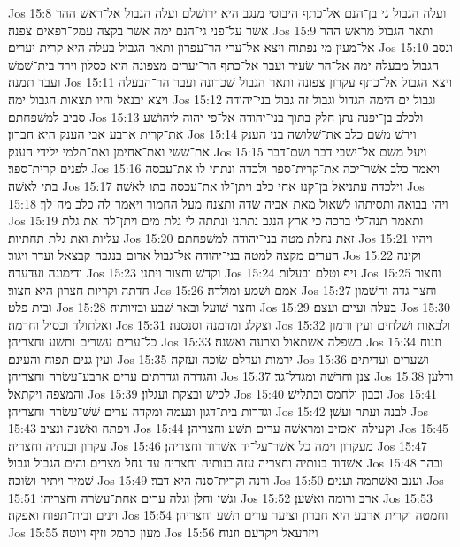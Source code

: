 Jos 15:8  ועלה הגבול גי בן־הנם אל־כתף היבוסי מנגב היא ירושׁלם ועלה הגבול אל־ראשׁ ההר אשׁר על־פני גי־הנם ימה אשׁר בקצה עמק־רפאים צפנה׃
Jos 15:9  ותאר הגבול מראשׁ ההר אל־מעין מי נפתוח ויצא אל־ערי הר־עפרון ותאר הגבול בעלה היא קרית יערים׃
Jos 15:10  ונסב הגבול מבעלה ימה אל־הר שׂעיר ועבר אל־כתף הר־יערים מצפונה היא כסלון וירד בית־שׁמשׁ ועבר תמנה׃
Jos 15:11  ויצא הגבול אל־כתף עקרון צפונה ותאר הגבול שׁכרונה ועבר הר־הבעלה ויצא יבנאל והיו תצאות הגבול ימה׃
Jos 15:12  וגבול ים הימה הגדול וגבול זה גבול בני־יהודה סביב למשׁפחתם׃
Jos 15:13  ולכלב בן־יפנה נתן חלק בתוך בני־יהודה אל־פי יהוה ליהושׁע את־קרית ארבע אבי הענק היא חברון׃
Jos 15:14  וירשׁ משׁם כלב את־שׁלושׁה בני הענק את־שׁשׁי ואת־אחימן ואת־תלמי ילידי הענק׃
Jos 15:15  ויעל משׁם אל־ישׁבי דבר ושׁם־דבר לפנים קרית־ספר׃
Jos 15:16  ויאמר כלב אשׁר־יכה את־קרית־ספר ולכדה ונתתי לו את־עכסה בתי לאשׁה׃
Jos 15:17  וילכדה עתניאל בן־קנז אחי כלב ויתן־לו את־עכסה בתו לאשׁה׃
Jos 15:18  ויהי בבואה ותסיתהו לשׁאול מאת־אביה שׂדה ותצנח מעל החמור ויאמר־לה כלב מה־לך׃
Jos 15:19  ותאמר תנה־לי ברכה כי ארץ הנגב נתתני ונתתה לי גלת מים ויתן־לה את גלת עליות ואת גלת תחתיות׃
Jos 15:20  זאת נחלת מטה בני־יהודה למשׁפחתם׃
Jos 15:21  ויהיו הערים מקצה למטה בני־יהודה אל־גבול אדום בנגבה קבצאל ועדר ויגור׃
Jos 15:22  וקינה ודימונה ועדעדה׃
Jos 15:23  וקדשׁ וחצור ויתנן׃
Jos 15:24  זיף וטלם ובעלות׃
Jos 15:25  וחצור חדתה וקריות חצרון היא חצור׃
Jos 15:26  אמם ושׁמע ומולדה׃
Jos 15:27  וחצר גדה וחשׁמון ובית פלט׃
Jos 15:28  וחצר שׁועל ובאר שׁבע ובזיותיה׃
Jos 15:29  בעלה ועיים ועצם׃
Jos 15:30  ואלתולד וכסיל וחרמה׃
Jos 15:31  וצקלג ומדמנה וסנסנה׃
Jos 15:32  ולבאות ושׁלחים ועין ורמון כל־ערים עשׂרים ותשׁע וחצריהן׃
Jos 15:33  בשׁפלה אשׁתאול וצרעה ואשׁנה׃
Jos 15:34  וזנוח ועין גנים תפוח והעינם׃
Jos 15:35  ירמות ועדלם שׂוכה ועזקה׃
Jos 15:36  ושׁערים ועדיתים והגדרה וגדרתים ערים ארבע־עשׂרה וחצריהן׃
Jos 15:37  צנן וחדשׁה ומגדל־גד׃
Jos 15:38  ודלען והמצפה ויקתאל׃
Jos 15:39  לכישׁ ובצקת ועגלון׃
Jos 15:40  וכבון ולחמס וכתלישׁ׃
Jos 15:41  וגדרות בית־דגון ונעמה ומקדה ערים שׁשׁ־עשׂרה וחצריהן׃
Jos 15:42  לבנה ועתר ועשׁן׃
Jos 15:43  ויפתח ואשׁנה ונציב׃
Jos 15:44  וקעילה ואכזיב ומראשׁה ערים תשׁע וחצריהן׃
Jos 15:45  עקרון ובנתיה וחצריה׃
Jos 15:46  מעקרון וימה כל אשׁר־על־יד אשׁדוד וחצריהן׃
Jos 15:47  אשׁדוד בנותיה וחצריה עזה בנותיה וחצריה עד־נחל מצרים והים הגבול וגבול׃
Jos 15:48  ובהר שׁמיר ויתיר ושׂוכה׃
Jos 15:49  ודנה וקרית־סנה היא דבר׃
Jos 15:50  וענב ואשׁתמה וענים׃
Jos 15:51  וגשׁן וחלן וגלה ערים אחת־עשׂרה וחצריהן׃
Jos 15:52  ארב ורומה ואשׁען׃
Jos 15:53  וינים ובית־תפוח ואפקה׃
Jos 15:54  וחמטה וקרית ארבע היא חברון וציער ערים תשׁע וחצריהן׃
Jos 15:55  מעון כרמל וזיף ויוטה׃
Jos 15:56  ויזרעאל ויקדעם וזנוח׃
